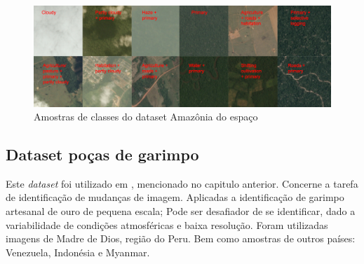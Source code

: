 \begin{figure}[!ht]
    \centering
    \includegraphics[width=0.9\columnwidth]{
        Imagens/chips.jpg
    }
    \caption{Amostras de classes do dataset Amazônia do espaço}
\label{fig:dataset}
\end{figure}



\subsection{Dataset poças de garimpo}\label{sec:Cap2_amazonia_garimpo}

Este \textit{dataset} foi utilizado em \cite{rs14071746}, mencionado no capitulo anterior. Concerne a tarefa de identificação de mudanças de imagem. Aplicadas a identificação de garimpo artesanal de ouro de pequena escala; Pode ser desafiador de se identificar, dado a variabilidade de condições atmosféricas e baixa resolução. Foram utilizadas imagens de Madre de Dios, região do Peru. Bem como amostras de outros países: Venezuela, Indonésia e Myanmar. 

